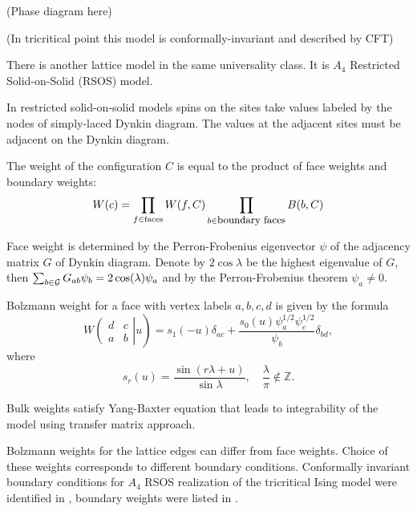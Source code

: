 \documentclass[12pt]{article}
\begin{document}
(Phase diagram here)

(In tricritical point this model is conformally-invariant and described by CFT)

There is another lattice model in the same universality class. It is $A_4$ Restricted Solid-on-Solid
(RSOS) model. 

In restricted solid-on-solid models spins on the sites take values labeled by the
nodes of simply-laced Dynkin diagram. The values at the adjacent sites must be adjacent on the
Dynkin diagram.

The weight of the configuration $C$ is equal to the product of
face weights and boundary weights:
\begin{equation}
  \label{eq:7}
  W(c)=\prod_{f\in \mathrm{faces}} W(f,C) \prod_{b\in \mbox{\small{boundary
      faces}}} B(b,C)
\end{equation}

Face weight is determined by the Perron-Frobenius
eigenvector $\psi$ of the adjacency matrix $G$ of Dynkin diagram. Denote by $2\cos\lambda$ be the
highest eigenvalue of $G$, then $\sum_{b\in {\cal G}} G_{ab}\psi_b = 2\cos(\lambda) \psi_a $ and 
by the Perron-Frobenius theorem $\psi_a \neq 0$. 

Bolzmann weight for a face with vertex labels $a,b,c,d$ is given by the formula
\begin{equation}
  \label{eq:5}
    W\left.\left(
    \begin{array}{cc}
      d & c\\
      a & b
    \end{array}\right| u \right)
= s_1 (-u)\delta_{ac} + \frac{s_0 (u) \psi_a^{1/2}
  \psi_c^{1/2}}{\psi_b} \delta_{bd},
\end{equation}
where
  \begin{equation}
    \label{eq:6}
    s_r(u)=\frac{\sin(r\lambda+u)}{\sin\lambda},\quad \frac{\lambda}{\pi}\not\in\mathbb{Z}.
  \end{equation}

Bulk weights satisfy Yang-Baxter equation \cite{behrend2001integrable}
that leads to integrability of the model using transfer matrix
approach. 

Bolzmann weights for the lattice edges can differ from face weights.
Choice of these weights corresponds to different boundary conditions.
Conformally invariant boundary conditions for $A_4$ RSOS realization
of the tricritical Ising model were identified in
\cite{chim1996boundary}, boundary weights were listed in
\cite{behrend2001integrable}. 
\end{document}
